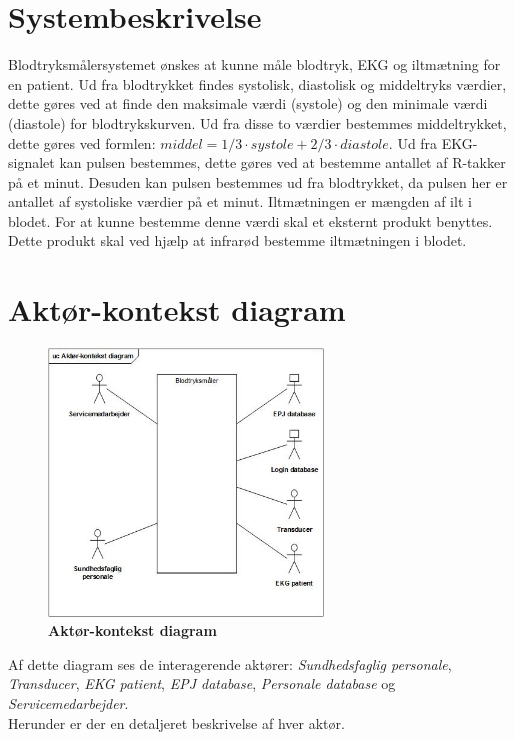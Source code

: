\section{Systembeskrivelse}
Blodtryksmålersystemet ønskes at kunne måle blodtryk, EKG og iltmætning for en patient. Ud fra blodtrykket findes systolisk, diastolisk og middeltryks værdier, dette gøres ved at finde den maksimale værdi (systole) og den minimale værdi (diastole) for blodtrykskurven. Ud fra disse to værdier bestemmes middeltrykket, dette gøres ved formlen: $middel = 1/3 \cdot systole + 2/3 \cdot diastole$. Ud fra EKG-signalet kan pulsen bestemmes, dette gøres ved at bestemme antallet af R-takker på et minut. Desuden kan pulsen bestemmes ud fra blodtrykket, da pulsen her er antallet af systoliske værdier på et minut. Iltmætningen er mængden af ilt i blodet. For at kunne bestemme denne værdi skal et eksternt produkt benyttes. Dette produkt skal ved hjælp at infrarød bestemme iltmætningen i blodet. 
\newpage

\section{Aktør-kontekst diagram}
\begin{figure}[h!]
\includegraphics[width =0.65\textwidth , center]{billeder/Aktorkontekst.jpg}
\caption{\textbf{Aktør-kontekst diagram}}
\end{figure}

Af dette diagram ses de interagerende aktører: \textit{Sundhedsfaglig personale}, \textit{Transducer}, \textit{EKG patient}, \textit{EPJ database}, \textit{Personale database} og \textit{Servicemedarbejder}.\\ Herunder er der en detaljeret beskrivelse af hver aktør.

